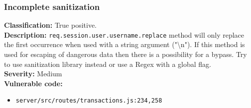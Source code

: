 \documentclass[]{article}
\begin{document}
\subsubsection{Incomplete sanitization}
\textbf{Classification:} {True positive.} \\
\textbf{Description:} \texttt{req.session.user.username.replace} method will only replace the first occurrence when used with a  
          string argument ("\textbackslash n"). If this method is used for escaping of dangerous data then there is a       
          possibility for a bypass. Try to use sanitization library instead or use a Regex with a global flag. \\ 
\textbf{Severity:} Medium \\ 
\textbf{Vulnerable code:}
\begin{itemize}
    \item \texttt{server/src/routes/transactions.js:234,258}
\end{itemize}
\end{document}
